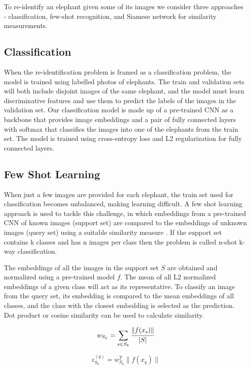 \documentclass[10pt,twocolumn,letterpaper]{article}
\begin{document}
To re-identify an elephant given some of its images we consider three approaches - classification, few-shot recognition, and Siamese network for similarity measurements.

\subsection{Classification}

When the re-identification problem is framed as a classification problem, the model is trained using labelled photos of elephants. The train and validation sets will both include disjoint images of the same elephant, and the model must learn discriminative features and use them to predict the labels of the images in the validation set. Our classification model is made up of a pre-trained CNN as a backbone that provides image embeddings and a pair of fully connected layers with softmax that classifies the images into one of the elephants from the train set. The model is trained using cross-entropy loss and L2 regularization for fully connected layers.


\subsection{Few Shot Learning}

When just a few images are provided for each elephant, the train set used for classification becomes unbalanced, making learning difficult. A few shot learning approach is used to tackle this challenge, in which embeddings from a pre-trained CNN of known images (support set) are compared to the embeddings of unknown images (query set) using a suitable similarity measure \cite{fewshotclassification}.  If the support set contains k classes and has n images per class then the problem is called n-shot k-way classification. 

The embeddings of all the images in the support set $S$ are obtained and normalized using a pre-trained model $f$. The mean of all L2 normalized embeddings of a given class will act as its representative. To classify an image from the query set, its embedding is compared to the mean embeddings of all classes, and the class with the closest embedding is selected as the prediction. Dot product or cosine similarity can be used to calculate similarity.

$$
w_{S_k} = \sum_{s \in S_k} \cfrac{ \lVert f(x_s) \rVert}{  | S | }
$$

$$
z_{S_k}^{(q)} = w_{S_k}^T \lVert f(x_q) \rVert
$$
\end{document}
